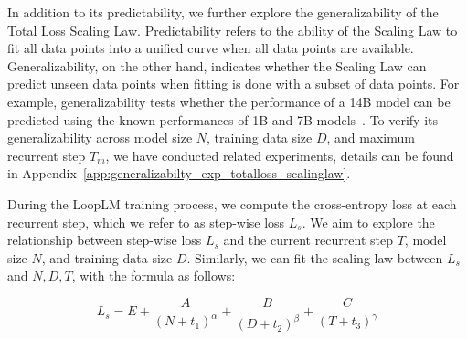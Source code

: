 \documentclass[]{bytedance_seed}
\newcommand{\1}{\mathbf{1}}
\newcommand{\ut}{LoopLM}
\begin{document}
{%
In addition to its predictability, we further explore the generalizability of the Total Loss Scaling Law. Predictability refers to the ability of the Scaling Law to fit all data points into a unified curve when all data points are available. Generalizability, on the other hand, indicates whether the Scaling Law can predict unseen data points when fitting is done with a subset of data points. For example, generalizability tests whether the performance of a 14B model can be predicted using the known performances of 1B and 7B models~\citep{que2024d}. To verify its generalizability across model size $N$, training data size $D$, and maximum recurrent step $T_m$, we have conducted related experiments, details can be found in Appendix~\ref{app:generalizabilty_exp_totalloss_scalinglaw}.

During the \ut{} training process, we compute the cross-entropy loss at each recurrent step, which we refer to as step-wise loss $L_s$. We aim to explore the relationship between step-wise loss $L_s$ and the current recurrent step $T$, model size $N$, and training data size $D$. Similarly, we can fit the scaling law between $L_s$ and $N,D,T$, with the formula as follows:

$$
L_s = E + \frac{A}{(N+t_1)^\alpha} + \frac{B}{(D+t_2)^\beta} + \frac{C}{(T+t_3)^\gamma}
$$

}
\end{document}
